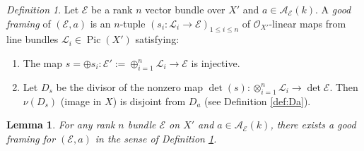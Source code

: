 \documentclass[reqno]{amsart}
\numberwithin{equation}{section}
\newcommand{\Cal}[1]{\mathcal{#1}}
\newcommand{\co}{\colon}
\DeclareMathOperator{\Div}{Div}
\DeclareMathOperator{\Pic}{Pic}
\newcommand{\WZ}[1]{{\color{blue} {#1}}}
\newcommand\xr{\xrightarrow}
\newcommand\op{\oplus}
\newcommand\ot{\otimes}
\newcommand{\s}{\sigma}
\newcommand\cA{\mathcal{A}}
\newcommand\cE{\mathcal{E}}
\newcommand\cL{\mathcal{L}}
\newcommand\cO{\mathcal{O}}
\newtheorem{lemma}[thm]{Lemma}
\theoremstyle{remark}
\newtheorem{defn}[thm]{Definition}
\numberwithin{equation}{section}
\begin{document}
\begin{defn}\label{def: auxiliary E'}  Let $\cE$ be a rank $n$ vector bundle over $X'$ and $a\in \cA_{\cE}(k)$. A {\em good framing} of $(\cE,a)$ is an $n$-tuple $(s_{i}: \cL_{i}\to \cE)_{1\le i\le n}$ of $\cO_{X'}$-linear maps from line bundles $\cL_{i}\in \Pic(X')$ satisfying:
\begin{enumerate}
\item The map $s=\op s_{i}: \cE':=\op_{i=1}^{n}\cL_{i}\to \cE$ is injective.
\item Let $D_{s}$ be the divisor of the nonzero map $\det(s): \ot_{i=1}^{n}\cL_{i}\to \det\cE$. Then $\nu(D_{s})$ (image in $X$) is  disjoint from $D_{a}$ (see Definition \ref{def:Da}). %
\end{enumerate}
\end{defn}

\begin{lemma} For any rank $n$ bundle $\cE$ on $X'$ and $a\in \cA_{\cE}(k)$, there exists a good framing for $(\cE,a)$ in the sense of Definition \ref{def: auxiliary E'}.
\end{lemma}
\end{document}
